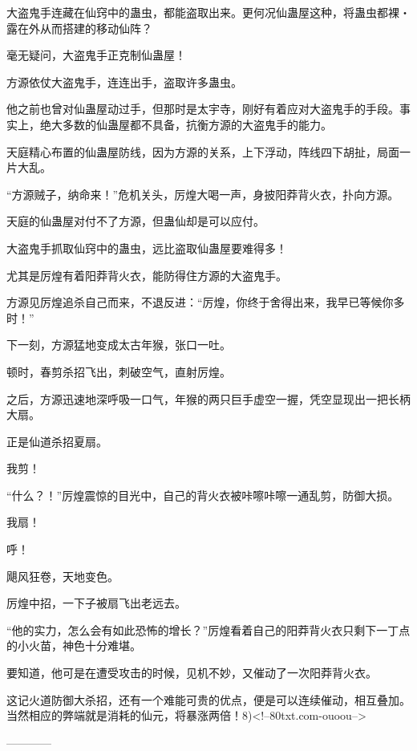 \begin{this_body}
大盗鬼手连藏在仙窍中的蛊虫，都能盗取出来。更何况仙蛊屋这种，将蛊虫都裸・露在外从而搭建的移动仙阵？

毫无疑问，大盗鬼手正克制仙蛊屋！

方源依仗大盗鬼手，连连出手，盗取许多蛊虫。

他之前也曾对仙蛊屋动过手，但那时是太宇寺，刚好有着应对大盗鬼手的手段。事实上，绝大多数的仙蛊屋都不具备，抗衡方源的大盗鬼手的能力。

天庭精心布置的仙蛊屋防线，因为方源的关系，上下浮动，阵线四下胡扯，局面一片大乱。

“方源贼子，纳命来！”危机关头，厉煌大喝一声，身披阳莽背火衣，扑向方源。

天庭的仙蛊屋对付不了方源，但蛊仙却是可以应付。

大盗鬼手抓取仙窍中的蛊虫，远比盗取仙蛊屋要难得多！

尤其是厉煌有着阳莽背火衣，能防得住方源的大盗鬼手。

方源见厉煌追杀自己而来，不退反进：“厉煌，你终于舍得出来，我早已等候你多时！”

下一刻，方源猛地变成太古年猴，张口一吐。

顿时，春剪杀招飞出，刺破空气，直射厉煌。

之后，方源迅速地深呼吸一口气，年猴的两只巨手虚空一握，凭空显现出一把长柄大扇。

正是仙道杀招夏扇。

我剪！

“什么？！”厉煌震惊的目光中，自己的背火衣被咔嚓咔嚓一通乱剪，防御大损。

我扇！

呼！

飓风狂卷，天地变色。

厉煌中招，一下子被扇飞出老远去。

“他的实力，怎么会有如此恐怖的增长？”厉煌看着自己的阳莽背火衣只剩下一丁点的小火苗，神色十分难堪。

要知道，他可是在遭受攻击的时候，见机不妙，又催动了一次阳莽背火衣。

这记火道防御大杀招，还有一个难能可贵的优点，便是可以连续催动，相互叠加。当然相应的弊端就是消耗的仙元，将暴涨两倍！8)<!--80txt.com-ouoou-->

------------

\end{this_body}

